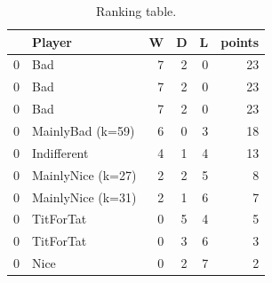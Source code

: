 \documentclass[journal,a4paper,10pt,twoside]{IEEEtran}
\begin{document}
\begin{table}
    \centering
    \begin{tabular}{llrrrr}
    \toprule
    {} &             Player &  W &  D &  L &  points \\
    \midrule
    0 &                Bad &  7 &  2 &  0 &      23 \\
    0 &                Bad &  7 &  2 &  0 &      23 \\
    0 &                Bad &  7 &  2 &  0 &      23 \\
    0 &   MainlyBad (k=59) &  6 &  0 &  3 &      18 \\
    0 &        Indifferent &  4 &  1 &  4 &      13 \\
    0 &  MainlyNice (k=27) &  2 &  2 &  5 &       8 \\
    0 &  MainlyNice (k=31) &  2 &  1 &  6 &       7 \\
    0 &          TitForTat &  0 &  5 &  4 &       5 \\
    0 &          TitForTat &  0 &  3 &  6 &       3 \\
    0 &               Nice &  0 &  2 &  7 &       2 \\
    \bottomrule
    \end{tabular}
    
    \caption{Ranking table.}
    \label{tab:ranking_df}
\end{table}
\end{document}
